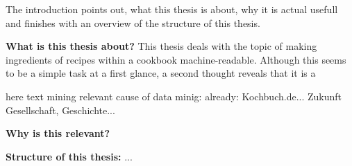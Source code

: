 The introduction points out, what this thesis is about, why it is actual usefull and finishes with an overview of the structure of this thesis.

\textbf{What is this thesis about?} This thesis deals with the topic of making ingredients of recipes within a cookbook machine-readable. Although this seems to be a simple task at a first glance, a second thought reveals that it is a 

here text mining
relevant cause of data minig:
	already: Kochbuch.de...
	Zukunft Gesellschaft, Geschichte...


\textbf{Why is this relevant?}


\textbf{Structure of this thesis:} ...